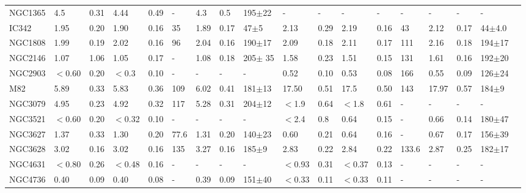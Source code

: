 \documentclass[legal,11pt]{article}
\begin{document}
\begin{landscape}
\begin{table}
\begin{tabular}{l l l l l l l l l l l l l l l l l l }
NGC1365    & 4.5     & 0.31    & 4.44    & 0.49    & -         & 4.3     & 0.5     & 195$\pm$22    & -       & -       & -       & -       & -         & -       & -       & -             \\
IC342      & 1.95    & 0.20    & 1.90    & 0.16    & 35        & 1.89    & 0.17    & 47$\pm$5      & 2.13    & 0.29    & 2.19    & 0.16    & 43        & 2.12    & 0.17    & 44$\pm$4.0    \\
NGC1808    & 1.99    & 0.19    & 2.02    & 0.16    & 96        & 2.04    & 0.16    & 190$\pm$17    & 2.09    & 0.18    & 2.11    & 0.17    & 111       & 2.16    & 0.18    & 194$\pm$17    \\
NGC2146    & 1.07    & 1.06    & 1.05    & 0.17    & -         & 1.08    & 0.18    & 205$\pm$ 35   & 1.58    & 0.23    & 1.51    & 0.15    & 131       & 1.61    & 0.16    & 192$\pm$20    \\
NGC2903    & $<$0.60 & 0.20    & $<$0.3  & 0.10    & -         & -       & -       & -             & 0.52    & 0.10    & 0.53    & 0.08    & 166       & 0.55    & 0.09    & 126$\pm$24    \\
M82        & 5.89    & 0.33    & 5.83    & 0.36    & 109       & 6.02    & 0.41    & 181$\pm$13    & 17.50   & 0.51    & 17.5    & 0.50    & 143       & 17.97   & 0.57    & 184$\pm$9     \\
NGC3079    & 4.95    & 0.23    & 4.92    & 0.32    & 117       & 5.28    & 0.31    & 204$\pm$12    & $<$1.9  & 0.64    & $<$1.8  & 0.61    & -         & -       & -       & -             \\
NGC3521    & $<$0.60 & 0.20    & $<$0.32 & 0.10    & -         & -       & -       & -             & $<$2.4  & 0.8     & 0.64    & 0.15    & -         & 0.66    & 0.14    & 180$\pm$47    \\
NGC3627    & 1.37    & 0.33    & 1.30    & 0.20    & 77.6      & 1.31    & 0.20    & 140$\pm$23    & 0.60    & 0.21    & 0.64    & 0.16    & -         & 0.67    & 0.17    & 156$\pm$39    \\
NGC3628    & 3.02    & 0.16    & 3.02    & 0.16    & 135       & 3.27    & 0.16    & 185$\pm$9     & 2.83    & 0.22    & 2.84    & 0.22    & 133.6     & 2.87    & 0.25    & 182$\pm$17    \\
NGC4631    & $<$0.80 & 0.26    & $<$0.48 & 0.16    & -         & -       & -       & -             & $<$0.93 & 0.31    & $<$0.37 & 0.13    & -         & -       & -       & -             \\
NGC4736    & 0.40    & 0.09    & 0.40    & 0.08    & -         & 0.39    & 0.09    & 151$\pm$40    & $<$0.33 & 0.11    & $<$0.33 & 0.11    & -         & -       & -       & -             \\

\end{tabular}
\end{table}
\end{landscape}
\end{document}
